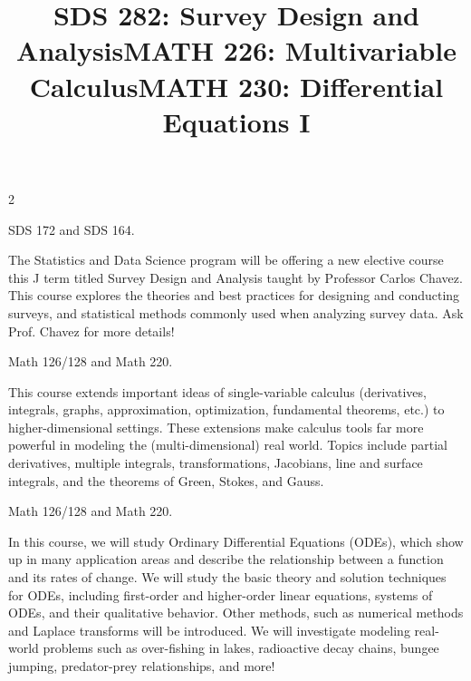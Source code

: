\documentclass[12pt]{article}
\newcommand{\bolder}{\textbf}
\begin{document}
\begin{multicols}{2}
\begin{tcolorbox}[colback=white, colframe=black]
    \begin{center}
    \title{{\large \bolder{SDS 282: Survey Design and Analysis}}}
    \end{center}
\end{tcolorbox}

 SDS 172 and SDS 164. 

The Statistics and Data Science program will be offering a new elective course this J term titled Survey Design and Analysis taught by Professor Carlos Chavez. This course explores the theories and best practices for designing and conducting surveys, and statistical methods commonly used when analyzing survey data. Ask Prof. Chavez for more details!  

\begin{tcolorbox}[colback=white, colframe=black]
    \begin{center}
    \title{{\large \bolder{MATH 226: Multivariable Calculus}}}
    \end{center}
\end{tcolorbox}

 Math 126/128 and Math 220.

This course extends important ideas of single-variable calculus (derivatives, integrals, graphs, approximation, optimization, fundamental theorems, etc.) to higher-dimensional settings. These extensions make calculus tools far more powerful in modeling the (multi-dimensional) real world. Topics include partial derivatives, multiple integrals, transformations, Jacobians, line and surface integrals, and the theorems of Green, Stokes, and Gauss.


\begin{tcolorbox}[colback=white, colframe=black]
    \begin{center}
    \title{{\large \bolder{MATH 230: Differential Equations I}}}
    \end{center}
\end{tcolorbox}

 Math 126/128 and Math 220.

In this course, we will study Ordinary Differential Equations (ODEs), which show up in many application areas and describe the relationship between a function and its rates of change. We will study the basic theory and solution techniques for ODEs, including first-order and higher-order linear equations, systems of ODEs, and their qualitative behavior. Other methods, such as numerical methods and Laplace transforms will be introduced. We will investigate modeling real-world problems such as over-fishing in lakes, radioactive decay chains, bungee jumping, predator-prey relationships, and more! 



\end{multicols}
\end{document}
